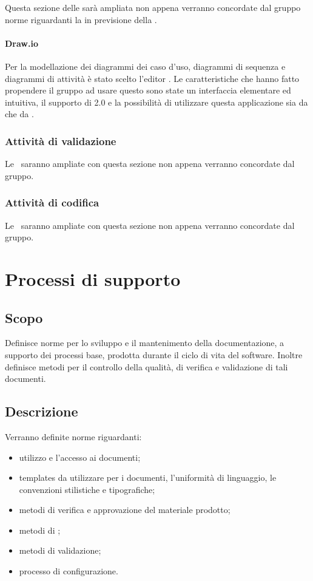 \documentclass[12pt,a4paper]{article}
\begin{document}
Questa sezione delle \NdP{} sarà ampliata non appena verranno concordate dal gruppo norme riguardanti la \FPA{} in previsione della \RP.


\paragraph{Draw.io}
Per la modellazione dei diagrammi dei caso d’uso, diagrammi di sequenza e diagrammi di attività è stato scelto l’editor . Le caratteristiche che hanno fatto propendere il gruppo ad usare questo  sono state un interfaccia elementare ed intuitiva, il supporto di 2.0 e la possibilità di utilizzare questa applicazione sia da  che da .

\subsubsection{Attività di validazione}
Le \NdP\ saranno ampliate con questa sezione non appena verranno concordate dal gruppo.

\subsubsection{Attività di codifica}
Le \NdP\ saranno ampliate con questa sezione non appena verranno concordate dal gruppo.

\newpage

\section{Processi di supporto}

\subsection{Scopo}
Definisce norme per lo sviluppo e il mantenimento della documentazione, a supporto dei processi base, prodotta durante il ciclo di vita del software. Inoltre definisce metodi per il controllo della qualità, di verifica e validazione di tali documenti.

\subsection{Descrizione}
Verranno definite norme riguardanti:
\begin{itemize}
	\item utilizzo e l'accesso ai documenti;
	\item templates da utilizzare per i documenti, l'uniformità di linguaggio, le convenzioni stilistiche e tipografiche;
	\item metodi di verifica e approvazione del materiale prodotto;
	\item metodi di ;
	\item metodi di validazione;
	\item processo di configurazione.
\end{itemize}
\end{document}
